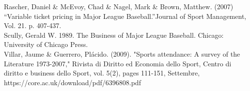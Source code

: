 \documentclass[preprint,12pt,times]{elsarticle}
\begin{document}
\noindent Rascher, Daniel \& McEvoy, Chad \& Nagel, Mark \& Brown, Matthew. (2007)  “Variable ticket pricing in Major League Baseball.”Journal of Sport Management, Vol. 21. p. 407-437.\\

\noindent Scully, Gerald W. 1989. The Business of Major League Baseball. Chicago: University of Chicago Press.\\

\noindent Villar, Jaume \& Guerrero, Plácido. (2009). "Sports attendance: A survey of the Literature 1973-2007," Rivista di Diritto ed Economia dello Sport, Centro di diritto e business dello Sport, vol. 5(2), pages 111-151, Settembre,
https://core.ac.uk/download/pdf/6396808.pdf
\end{document}
